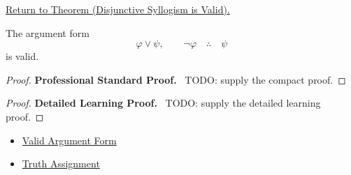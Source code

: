 \newpage
{}
\label{prf:disjunctive-syllogism-validity-propositional-logic}

\begin{remark*}[Return]
\hyperref[thm:disjunctive-syllogism-validity-propositional-logic]{Return to Theorem (Disjunctive Syllogism is Valid).}
\end{remark*}

\begin{theorem*}
The argument form
\[
\varphi\lor\psi,\qquad \neg\varphi \quad\therefore\quad \psi
\]
is valid.
\end{theorem*}

\begin{proof}
\textbf{Professional Standard Proof.}~
TODO: supply the compact proof.
\end{proof}

\begin{proof}
\textbf{Detailed Learning Proof.}~
TODO: supply the detailed learning proof.
\end{proof}

\begin{remark*}
\end{remark*}

\begin{dependencies}
\begin{itemize}
  \item \hyperref[def:valid-argument-form-propositional-logic]{Valid Argument Form}
  \item \hyperref[def:truth-assignment-propositional-logic]{Truth Assignment}
\end{itemize}
\end{dependencies}

\clearpage
